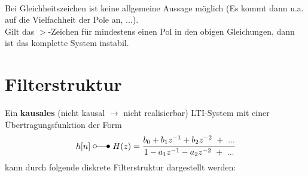 \documentclass[a4paper,11pt]{article}
\begin{document}
\vspace{.3cm}\\
Bei Gleichheitszeichen ist keine allgemeine Aussage möglich (Es kommt dann u.a. auf die Vielfachheit der Pole an, ...). \\Gilt das $>$-Zeichen für mindestens einen Pol in den obigen Gleichungen, dann ist das komplette System instabil.

\section*{Filterstruktur \large}
Ein \textbf{kausales} (nicht kausal $\rightarrow$ nicht realisierbar) LTI-System mit einer Übertragungsfunktion der Form
$$h[n]\ \laplace\ H(z)=\cfrac{b_0+b_1z^{-1}+b_2z^{-2}\ +\ ...}{1-a_1z^{-1}-a_2z^{-2}\ +\ ...}$$
kann durch folgende diskrete Filterstruktur dargestellt werden:
\end{document}
